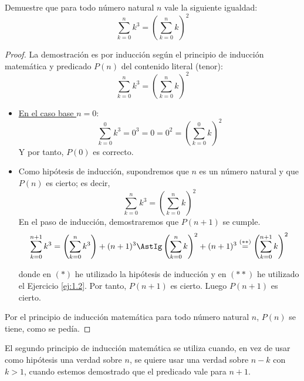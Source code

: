 \begin{ejercicio}
    Demuestre que para todo número natural $n$ vale la siguiente igualdad:
    $$\sum_{k=0}^n k^3 = \left(\sum_{k=0}^n k\right)^2$$
\begin{proof}
    La demostración es por inducción según el principio de inducción matemática y predicado $P(n)$ del contenido literal (tenor):
    $$\sum_{k=0}^n k^3 = \left(\sum_{k=0}^n k\right)^2$$
    \begin{itemize}
        \item \ul{En el caso base $n = 0$}:
        $$\sum_{k=0}^0 k^3 = 0^3 = 0 = 0^2 = \left(\sum_{k=0}^0 k\right)^2$$
        Y por tanto, $P(0)$ es correcto.
        
        \item Como hipótesis de inducción, supondremos que $n$ es un número natural y que $P(n)$ es cierto; es decir, 
        $$\sum_{k=0}^{n} k^3 = \left(\sum_{k=0}^n k\right)^2$$
        En el paso de inducción, demostraremos que $P(n+1)$ se cumple.
        $$\sum_{k=0}^{n+1} k^3 = \left(\sum_{k=0}^n k^3\right) + (n+1)^3 \AstIg \left(\sum_{k=0}^n k\right)^2 + (n+1)^3 \stackrel{(\ast\ast)}{=} \left(\sum_{k=0}^{n+1} k\right)^2  $$

        donde en $(\ast)$ he utilizado la hipótesis de inducción y en $(\ast\ast)$ he utilizado el Ejercicio \ref{ej:1.2}. Por tanto, $P(n+1)$ es cierto.
        Luego $P(n+1)$ es cierto.
    \end{itemize}
    Por el principio de inducción matemática para todo número natural $n$, $P(n)$ se tiene, como se pedía.
\end{proof}
\end{ejercicio}

\begin{observacion}
    El segundo principio de inducción matemática se utiliza cuando, en vez de usar como hipótesis una verdad sobre $n$, se quiere usar una verdad sobre $n-k$ con $k >1$, cuando estemos demostrado que el predicado vale para $n+1$.
\end{observacion}

